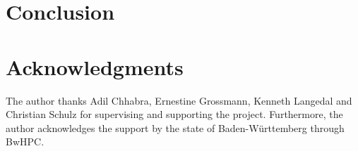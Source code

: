 \documentclass[acmsmall,nonacm,screen,review]{acmart}
\begin{document}
\section{Conclusion}
\section{Acknowledgments}
The author thanks Adil Chhabra, Ernestine Grossmann, Kenneth Langedal and Christian Schulz for supervising and supporting the project. Furthermore, the author acknowledges the support by the state of Baden-Württemberg through BwHPC.


\end{document}

